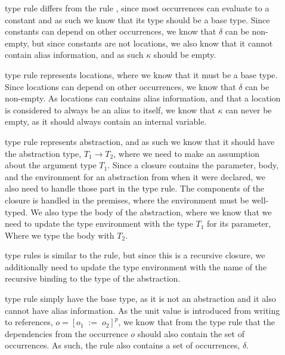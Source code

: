 \documentclass[../../master.tex]{subfiles}
\begin{document}
\begin{description}
	\item[] type rule differs from the rule , since most occurrences can evaluate to a constant and as such we know that its type should be a base type.
		Since constants can depend on other occurrences, we know that $\delta$ can be non-empty, but since constants are not locations, we also know that it cannot contain alias information, and as such $\kappa$ should be empty.

	\item[] type rule represents locations, where we know that it must be a base type.
		Since locations can depend on other occurrences, we know that $\delta$ can be non-empty.
		As locations can contains alias information, and that a location is considered to always be an alias to itself, we know that $\kappa$ can never be empty, as it should always contain an internal variable. 

	\item[] type rule represents abstraction, and as such we know that it should have the abstraction type, $T_1\rightarrow T_2$, where we need to make an assumption about the argument type $T_1$.
		Since a closure contains the parameter, body, and the environment for an abstraction from when it were declared, we also need to handle those part in the type rule.
		The components of the closure is handled in the premises, where the environment must be well-typed.
		We also type the body of the abstraction, where we know that we need to update the type environment with the type $T_1$ for its parameter, Where we type the body with $T_2$.

	\item[] type rules is similar to the  rule, but since this is a recursive closure, we additionally need to update the type environment with the name of the recursive binding to the type of the abstraction.

	\item[] type rule simply have the base type, as it is not an abstraction and it also cannot have alias information.
		As the unit value is introduced from writing to references, $o=[o_1\;:=\;o_2]^p$, we know that from the type rule  that the dependencies from the occurrence $o$ should also contain the set of occurrences.
		As such, the  rule also contains a set of occurrences, $\delta$.
\end{description}
\end{document}
